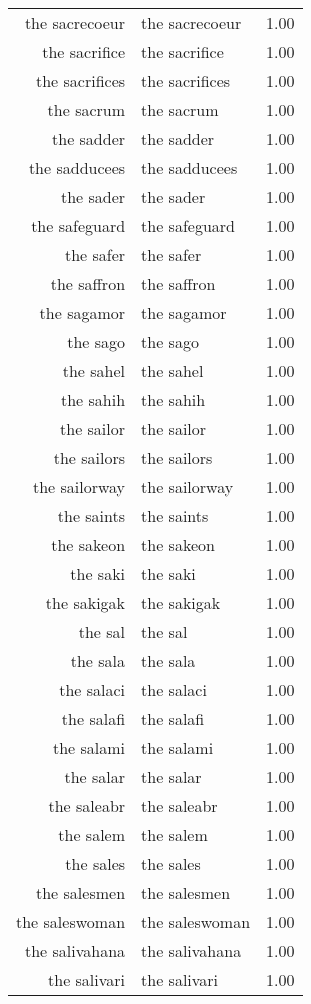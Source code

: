 \begin{table}[ht]
\begin{tabular}{rlr}
  the sacrecoeur & the sacrecoeur & 1.00 \\ 
  the sacrifice & the sacrifice & 1.00 \\ 
  the sacrifices & the sacrifices & 1.00 \\ 
  the sacrum & the sacrum & 1.00 \\ 
  the sadder & the sadder & 1.00 \\ 
  the sadducees & the sadducees & 1.00 \\ 
  the sader & the sader & 1.00 \\ 
  the safeguard & the safeguard & 1.00 \\ 
  the safer & the safer & 1.00 \\ 
  the saffron & the saffron & 1.00 \\ 
  the sagamor & the sagamor & 1.00 \\ 
  the sago & the sago & 1.00 \\ 
  the sahel & the sahel & 1.00 \\ 
  the sahih & the sahih & 1.00 \\ 
  the sailor & the sailor & 1.00 \\ 
  the sailors & the sailors & 1.00 \\ 
  the sailorway & the sailorway & 1.00 \\ 
  the saints & the saints & 1.00 \\ 
  the sakeon & the sakeon & 1.00 \\ 
  the saki & the saki & 1.00 \\ 
  the sakigak & the sakigak & 1.00 \\ 
  the sal & the sal & 1.00 \\ 
  the sala & the sala & 1.00 \\ 
  the salaci & the salaci & 1.00 \\ 
  the salafi & the salafi & 1.00 \\ 
  the salami & the salami & 1.00 \\ 
  the salar & the salar & 1.00 \\ 
  the saleabr & the saleabr & 1.00 \\ 
  the salem & the salem & 1.00 \\ 
  the sales & the sales & 1.00 \\ 
  the salesmen & the salesmen & 1.00 \\ 
  the saleswoman & the saleswoman & 1.00 \\ 
  the salivahana & the salivahana & 1.00 \\ 
  the salivari & the salivari & 1.00 \\ 

\end{tabular}
\end{table}
